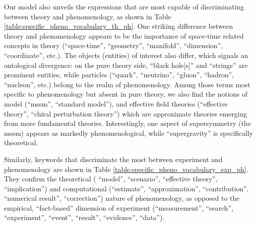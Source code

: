 \documentclass[smallextended]{svjour3}
\begin{document}
Our model also unveils the expressions that are most capable of discriminating between theory and phenomenology, as shown in Table \ref{table:specific_pheno_vocabulary_th_ph}. One striking difference between theory and phenomenology appears to be the importance of space-time related concepts in theory (``space-time'', ``geometry'',  ``manifold'', ``dimension'', ``coordinate'', etc.). The objects (entities) of interest also differ, which signals an ontological divergence: on the pure theory side, ``black hole[s]'' and ``strings'' are prominent entities, while particles (``quark'', ``neutrino'', ``gluon'', ``hadron'', ``nucleon'', etc.) belong to the realm of phenomenology. Among those terms most specific to phenomenology but absent in pure theory, we also  find the notions of model (``mssm'', ``standard model''), and effective field theories (``effective theory'', ``chiral perturbation theory'') which are approximate theories emerging from more fundamental theories. Interestingly, one aspect of supersymmetry (the \gls{mssm}) appears as markedly phenomenological, while ``supergravity'' is specifically theoretical.


\setlength\extrarowheight{2pt}

Similarly, keywords that discriminate the most between experiment and phenomenology are shown in Table \ref{table:specific_pheno_vocabulary_exp_ph}. They confirm the theoretical ( ``model'', ``scenario'', ``effective theory'', ``implication'') and computational (``estimate'', ``approximation'',  ``contribution'', ``numerical result'', ``correction'') nature of phenomenology, as opposed to the empirical, ``fact-based'' dimension of experiment (``measurement'', ``search'', ``experiment'', ``event'', ``result'', ``evidence'', ``data'').

\setlength\extrarowheight{2pt}
\end{document}
